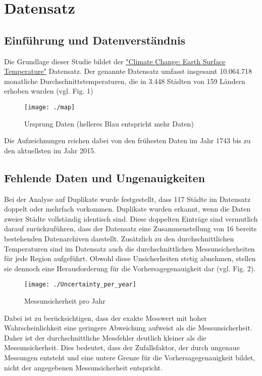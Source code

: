 \documentclass[acmtog, authorversion]{acmart} %
\begin{document}
\section{Datensatz}
\subsection{Einführung und Datenverständnis}
Die Grundlage dieser Studie bildet der \href{https://www.kaggle.com/datasets/berkeleyearth/climate-change-earth-surface-temperature-data?select=GlobalLandTemperaturesByCity.csv}{"Climate Change: Earth Surface Temperature"} Datensatz.
Der genannte Datensatz umfasst insgesamt 10.064.718 monatliche Durchschnittstemperaturen, die in 3.448 Städten von 159 Ländern erhoben wurden (vgl. Fig. 1)
\begin{figure}[htp]
    \flushleft
    \texttt{[image: ./map]}
    \caption{Ursprung Daten (helleres Blau entspricht mehr Daten)}
    \label{fig:sub1}
\end{figure}

Die Aufzeichnungen reichen dabei von den frühesten Daten im Jahr 1743 bis zu den aktuellsten im Jahr 2015.

\subsection{Fehlende Daten und Ungenauigkeiten}
Bei der Analyse auf Duplikate wurde festgestellt, dass 117 Städte im Datensatz doppelt oder mehrfach vorkommen. Duplikate wurden erkannt, wenn die Daten zweier Städte vollständig identisch sind. Diese doppelten Einträge sind vermutlich darauf zurückzuführen, dass der Datensatz eine Zusammenstellung von 16 bereits bestehenden Datenarchiven darstellt. Zusätzlich zu den durchschnittlichen Temperaturen sind im Datensatz auch die durchschnittlichen Messunsicherheiten für jede Region aufgeführt. Obwohl diese Unsicherheiten stetig abnehmen, stellen sie dennoch eine Herausforderung für die Vorhersagegenauigkeit dar (vgl. Fig. 2).
\begin{figure}[htp]
    \flushleft
    \texttt{[image: ./Uncertainty\_per\_year]}
    \label{fig:sub2}
    \caption{Messunsicherheit pro Jahr}
\end{figure}
Dabei ist zu berücksichtigen, dass der exakte Messwert mit hoher Wahrscheinlichkeit eine geringere Abweichung aufweist als die Messunsicherheit. Daher ist der durchschnittliche Messfehler deutlich kleiner als die Messunsicherheit. Dies bedeutet, dass der Zufallsfaktor, der durch ungenaue Messungen entsteht und eine untere Grenze für die Vorhersagegenauigkeit bildet, nicht der angegebenen Messunsicherheit entspricht.
\end{document}
